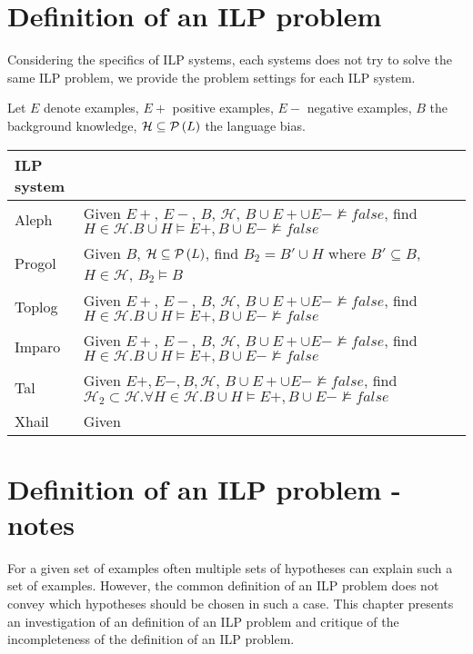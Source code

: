 \chapter{Definition of an ILP problem}
Considering the specifics of ILP systems, each systems does not try to solve the same ILP problem, we provide the problem settings for each ILP system.

Let $E$ denote examples, $E+$ positive examples, $E-$ negative examples, $B$ the background knowledge, $\mathcal{H} \subseteq \mathcal{P} \left({ L }\right)$ the language bias.
\begin{center}
    \begin{tabular}{ | l | p{15cm} | l | p{5cm} |}
    \hline
    ILP system & \\ \hline
    Aleph & Given $E+$, $E-$, $B$, $\mathcal{H}$, $B \cup E+ \cup E- \not\models false$, find $H \in \mathcal{H}. B \cup H \models E+, B \cup E- \not\models false$\\ \hline
    Progol & Given $B$, $\mathcal{H} \subseteq \mathcal{P} \left({ L }\right)$, find $B_2 = B' \cup H$ where $B' \subseteq B$, $H \in \mathcal{H}$, $B_2 \models B$\\ \hline
    Toplog & Given $E+$, $E-$, $B$, $\mathcal{H}$, $B \cup E+ \cup E- \not\models false$, find $H \in \mathcal{H}. B \cup H \models E+, B \cup E- \not\models false$ \\ \hline
    Imparo & Given $E+$, $E-$, $B$, $\mathcal{H}$, $B \cup E+ \cup E- \not\models false$, find $H \in \mathcal{H}. B \cup H \models E+, B \cup E- \not\models false$ \\ \hline
    Tal & Given $E+, E-, B, \mathcal{H}$, $B \cup E+ \cup E- \not\models false$, find $\mathcal{H}_2 \subset \mathcal{H}. \forall H \in \mathcal{H}. B \cup H \models E+, B \cup E- \not\models false$ \\ \hline
    Xhail & Given \\ \hline
    \hline
    \end{tabular}
\end{center}
    
\chapter{Definition of an ILP problem - notes}
For a given set of examples often multiple sets of hypotheses can explain such a set of examples. However, the common definition of an ILP problem does not convey which hypotheses should be chosen in such a case. This chapter presents an investigation of an definition of an ILP problem and critique of the incompleteness of the definition of an ILP problem.

